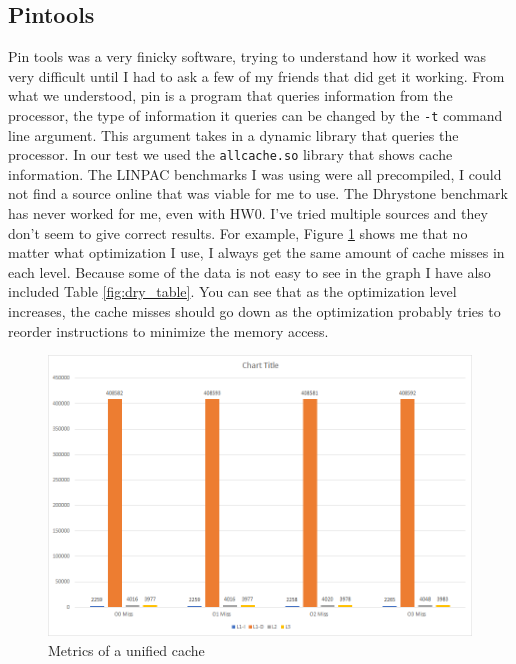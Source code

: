 \documentclass{article}
\begin{document}
    \subsection{Pintools}
        Pin tools was a very finicky software, trying to understand how it worked was very difficult until I had to ask a few of my friends that did get it working. From what we understood, pin is a program that queries information from the processor, the type of information it queries can be changed by the \verb|-t| command line argument. This argument takes in a dynamic library that queries the processor. In our test we used the \verb|allcache.so| library that shows cache information. The LINPAC benchmarks I was using were all precompiled, I could not find a source online that was viable for me to use. The Dhrystone benchmark has never worked for me, even with HW0. I’ve tried multiple sources and they don’t seem to give correct results. For example, Figure \ref{fig:dry_graph} shows me that no matter what optimization I use, I always get the same amount of cache misses in each level. Because some of the data is not easy to see in the graph I have also included Table \ref{fig:dry_table}. You can see that as the optimization level increases, the cache misses should go down as the optimization probably tries to reorder instructions to minimize the memory access.
        \begin{figure}[H]
            \label{fig:dry_graph}
            \begin{center}
                \includegraphics[width=\textwidth]{dry_graph.png}
                \caption{Metrics of a unified cache}
            \end{center}
        \end{figure}
\end{document}
